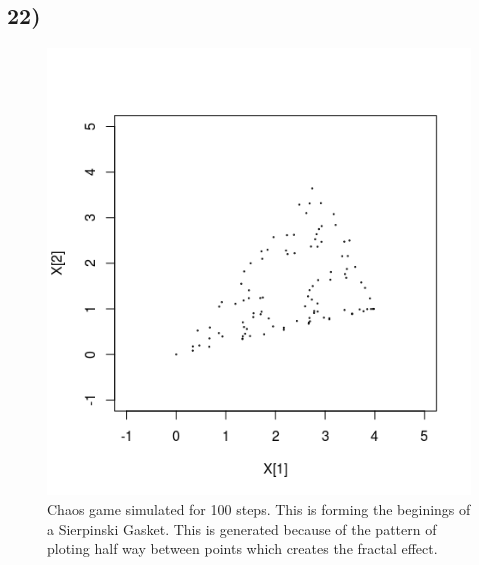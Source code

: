 \documentclass[11pt]{article}
\begin{document}
\subsection*{22)}
\begin{figure}[H]
\begin{center}
\includegraphics[scale=0.5]{../Results/Plots/Chaos_100.png}
\caption{Chaos game simulated for 100 steps. This is forming the beginings of a Sierpinski Gasket. This is generated because of the pattern of ploting half way between points which creates the fractal effect. }
\end{center}
\end{figure} 
\end{document}
